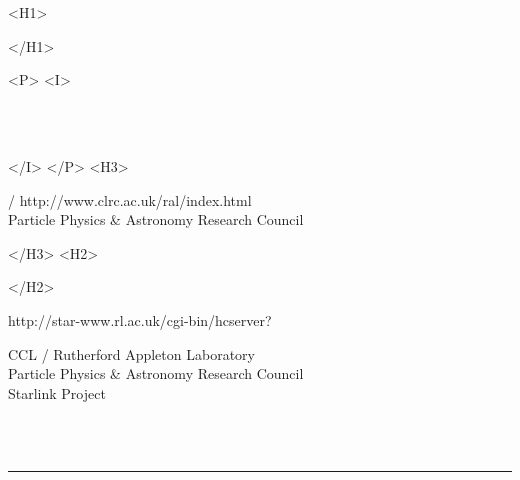 \thispagestyle{empty}
\begin{htmlonly}
   \xlabel{}
   \label{stardoctoppage}
   \begin{rawhtml} <H1> \end{rawhtml}
      \stardoctitle
   \begin{rawhtml} </H1> \end{rawhtml}


   \begin{rawhtml} <P> <I> \end{rawhtml}
   \stardoccategory \stardocnumber \\
   \stardocauthors \\
   \stardocdate
   \begin{rawhtml} </I> </P> <H3> \end{rawhtml}
       /
                        {http://www.clrc.ac.uk/ral/index.html} \\
      Particle Physics \& Astronomy Research Council \\
   \begin{rawhtml} </H3> <H2> \end{rawhtml}
   \begin{rawhtml} </H2> \end{rawhtml}
      {http://star-www.rl.ac.uk/cgi-bin/hcserver?\stardocsource}\\
\end{htmlonly}
\begin{latexonly}
   CCL / {\sc Rutherford Appleton Laboratory} \hfill {\bf \stardocname}\\
   {\large Particle Physics \& Astronomy Research Council}\\
   {\large Starlink Project\\}
   {\large \stardoccategory\ \stardocnumber}
   \begin{flushright}
   \stardocauthors\\
   \stardocdate
   \end{flushright}
   \vspace{-4mm}
   \rule{\textwidth}{0.5mm}
   \vspace{5mm}
   \begin{center}
   {\Large\bf \stardoctitle}
   \end{center}
   \vspace{5mm}
\end{latexonly}

